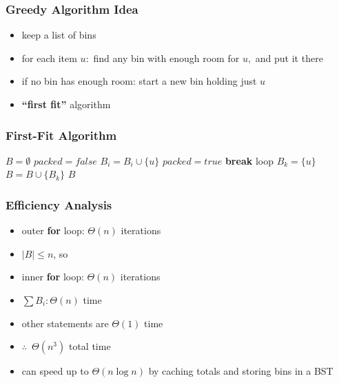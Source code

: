 \documentclass{beamer}
\begin{document}
\begin{frame} \frametitle{Greedy Algorithm Idea}
  \begin{itemize}
    \item keep a list of bins
    \item for each item $u:$ find any bin with enough room for $u,$ and put it there
    \item if no bin has enough room: start a new bin holding just $u$
    \item \textbf{``first fit''} algorithm
  \end{itemize}
\end{frame}

\begin{frame} \frametitle{First-Fit Algorithm}
  {\footnotesize
  \begin{algorithmic}[1]
      \State $B = \emptyset$ 
        \State $packed = false$
           
            \State $B_i = B_i \cup \{ u \}$
            \State $packed = true$
            \State \textbf{break} loop
          \EndIf
        \EndFor
          \State $B_k = \{ u \} $ 
          \State $B = B \cup \{ B_k \}$
        \EndIf
      \EndFor
      \State \Return $B$
    \EndFunction
  \end{algorithmic}
  }
\end{frame}

\begin{frame} \frametitle{Efficiency Analysis}
\begin{itemize}
  \item outer \textbf{for} loop: $\Theta(n)$ iterations
  \item $|B| \leq n$, so
  \item inner \textbf{for} loop: $\Theta(n)$ iterations
  \item $\sum B_i: \Theta(n)$ time
  \item other statements are $\Theta(1)$ time
  \item $\therefore \enspace \Theta(n^3)$ total time
  \item can speed up to $\Theta(n \log n)$ by caching totals and storing bins in a BST
\end{itemize}
\end{frame}
\end{document}
